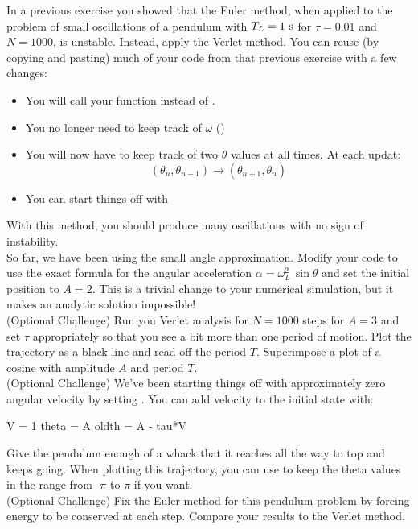 \plot  In a previous exercise you showed that the Euler method, when applied to the problem of small oscillations of a pendulum with $T_L=1~\rm s$ for $\tau=0.01$ and $N=1000$, is unstable.  Instead, apply the Verlet method.  You can reuse (by copying and pasting) much of your code from that previous exercise with a few changes:
\begin{itemize}
 \item You will call your  function instead of .
 \item You no longer need to keep track of $\omega$ ()
 \item You will now have to keep track of two $\theta$ values at all times.  At each updat:
\begin{displaymath}
   (\theta_n, \theta_{n-1}) \rightarrow  (\theta_{n+1}, \theta_{n})
\end{displaymath}
 \item You can start things off with 
\end{itemize}
With this method, you should produce many oscillations with no sign of instability.\\

\plot So far, we have been using the small angle approximation.  Modify your code to use the exact formula for the angular acceleration $\alpha = \omega_L^2 \, \sin \theta$ and set the initial position to $A=2$.  This is a trivial change to your numerical simulation, but it  makes an analytic solution impossible!\\


\plot (Optional Challenge) Run you Verlet analysis for $N=1000$ steps
for $A=3$ and set $\tau$ appropriately so that you see a bit more than
one period of motion.  Plot the trajectory as a black line and read
off the period $T$.  Superimpose a plot of a cosine with amplitude $A$
and period $T$.\\

\plot (Optional Challenge) We've been starting things off with
approximately zero angular velocity by setting
.
You can add velocity to the initial state with:
\begin{python}
  V = 1
  theta = A
  oldth = A - tau*V
\end{python}
Give the pendulum enough of a whack that it reaches all the way to top
and keeps going.  When plotting this trajectory, you can use  to
keep the theta values in the range from -$\pi$ to $\pi$ if you want.\\

\plot (Optional Challenge) Fix the Euler method for this pendulum
problem by forcing energy to be conserved at each step.  Compare your
results to the Verlet method.\\















